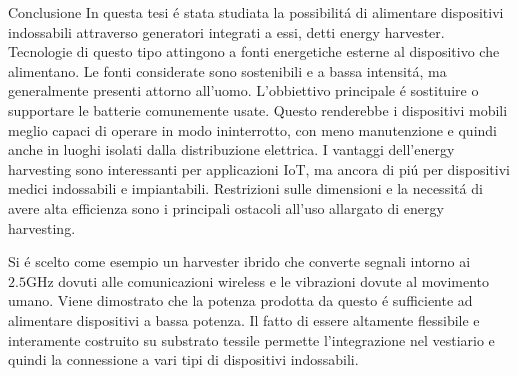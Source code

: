 \documentclass[12pt,a4paper]{extreport}
\begin{document}
\begin{chapter}{Conclusione}
    In questa tesi \'e stata studiata la possibilit\'a di alimentare dispositivi indossabili attraverso generatori integrati a essi, detti energy harvester. Tecnologie di questo tipo attingono a fonti energetiche esterne al dispositivo che alimentano. Le fonti considerate sono sostenibili e a bassa intensit\'a, ma generalmente presenti attorno all'uomo. L'obbiettivo principale \'e sostituire o supportare le batterie comunemente usate. Questo renderebbe i dispositivi mobili meglio capaci di operare in modo ininterrotto, con meno manutenzione e quindi anche in luoghi isolati dalla distribuzione elettrica. I vantaggi dell'energy harvesting sono interessanti per applicazioni IoT, ma ancora di pi\'u per dispositivi medici indossabili e impiantabili. Restrizioni sulle dimensioni e la necessit\'a di avere alta efficienza sono i principali ostacoli all'uso allargato di energy harvesting.

    Si \'e scelto come esempio un harvester ibrido che converte segnali intorno ai \(2.5\mathrm{GHz}\) dovuti alle comunicazioni wireless e le vibrazioni dovute al movimento umano. Viene dimostrato che la potenza prodotta da questo \'e sufficiente ad alimentare dispositivi a bassa potenza. Il fatto di essere altamente flessibile e interamente costruito su substrato tessile permette l'integrazione nel vestiario e quindi la connessione a vari tipi di dispositivi indossabili.  
\end{chapter}




\end{document}
